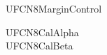 \documentclass{abntexto-ufc}
\begin{document}
\textual

\noindent UFCN8MarginControl\par

\vspace{\baselineskip}
\begingroup
\singlesp
\noindent UFCN8CalAlpha\\
UFCN8CalBeta\par
\endgroup

\nocite{n8alpha,n8beta}
\imprimirreferencias
\end{document}
